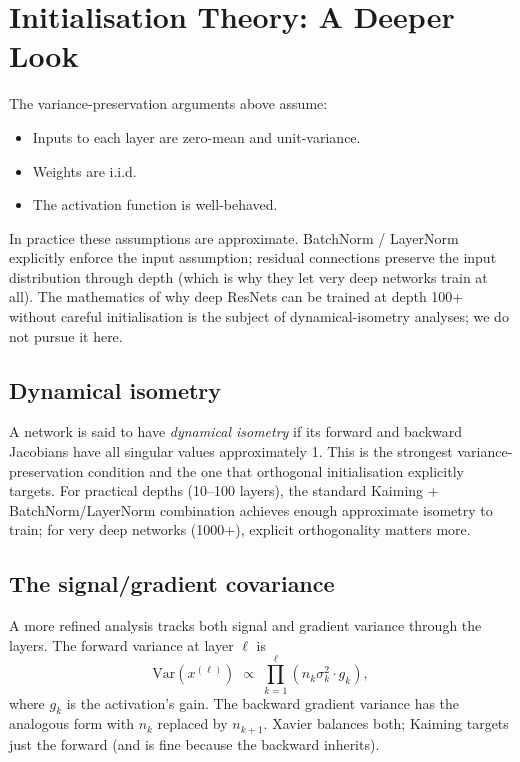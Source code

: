 \section{Initialisation Theory: A Deeper Look}
\label{sec:initialization:theory}

The variance-preservation arguments above assume:
\begin{itemize}
  \item Inputs to each layer are zero-mean and unit-variance.
  \item Weights are i.i.d.
  \item The activation function is well-behaved.
\end{itemize}

In practice these assumptions are approximate. BatchNorm /
LayerNorm explicitly enforce the input assumption; residual
connections preserve the input distribution through depth (which
is why they let very deep networks train at all). The mathematics
of why deep ResNets can be trained at depth 100+ without careful
initialisation is the subject of dynamical-isometry analyses; we
do not pursue it here.

\subsection{Dynamical isometry}
\label{ssec:initialization:dynamical_isometry}

A network is said to have \emph{dynamical isometry} if its
forward and backward Jacobians have all singular values
approximately 1. This is the strongest variance-preservation
condition and the one that orthogonal initialisation explicitly
targets. For practical depths (10--100 layers), the standard
Kaiming + BatchNorm/LayerNorm combination achieves enough
approximate isometry to train; for very deep networks (1000+),
explicit orthogonality matters more.

\subsection{The signal/gradient covariance}
\label{ssec:initialization:signal_grad_cov}

A more refined analysis tracks both signal and gradient variance
through the layers. The forward variance at layer $\ell$ is
\[
\mathrm{Var}(x^{(\ell)}) \;\propto\; \prod_{k=1}^{\ell} (n_k \sigma_k^2 \cdot g_k),
\]
where $g_k$ is the activation's gain. The backward gradient
variance has the analogous form with $n_k$ replaced by
$n_{k+1}$. Xavier balances both; Kaiming targets just the
forward (and is fine because the backward inherits).

